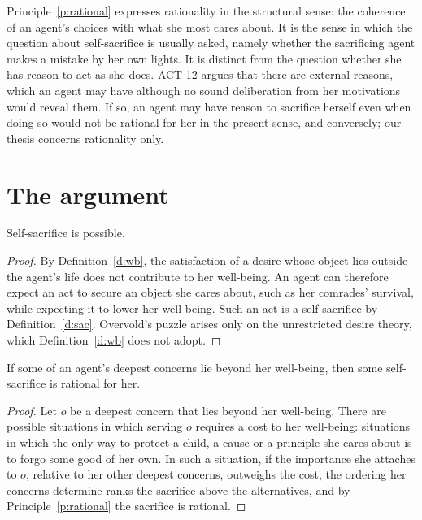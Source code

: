 \documentclass{situationist-preprint}
\begin{document}
Principle~\ref{p:rational} expresses rationality in the structural sense: the coherence of an agent's choices with what she most cares about. It is the sense in which the question about self-sacrifice is usually asked, namely whether the sacrificing agent makes a mistake by her own lights. It is distinct from the question whether she has reason to act as she does. ACT-12 argues that there are external reasons, which an agent may have although no sound deliberation from her motivations would reveal them. If so, an agent may have reason to sacrifice herself even when doing so would not be rational for her in the present sense, and conversely; our thesis concerns rationality only.

\section{The argument}

\begin{lemma}\label{l:possible}
Self-sacrifice is possible.
\end{lemma}

\begin{proof}
By Definition~\ref{d:wb}, the satisfaction of a desire whose object lies outside the agent's life does not contribute to her well-being. An agent can therefore expect an act to secure an object she cares about, such as her comrades' survival, while expecting it to lower her well-being. Such an act is a self-sacrifice by Definition~\ref{d:sac}. Overvold's puzzle arises only on the unrestricted desire theory, which Definition~\ref{d:wb} does not adopt.
\end{proof}

\begin{lemma}\label{l:if}
If some of an agent's deepest concerns lie beyond her well-being, then some self-sacrifice is rational for her.
\end{lemma}

\begin{proof}
Let $o$ be a deepest concern that lies beyond her well-being. There are possible situations in which serving $o$ requires a cost to her well-being: situations in which the only way to protect a child, a cause or a principle she cares about is to forgo some good of her own. In such a situation, if the importance she attaches to $o$, relative to her other deepest concerns, outweighs the cost, the ordering her concerns determine ranks the sacrifice above the alternatives, and by Principle~\ref{p:rational} the sacrifice is rational.
\end{proof}
\end{document}
